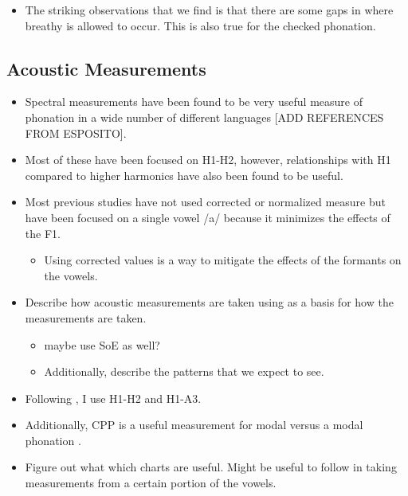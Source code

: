 \documentclass[12pt, letterpaper]{article}
\begin{document}
\begin{itemize}
	\item The striking observations that we find is that there are some gaps in where breathy is allowed to occur. This is also true for the checked phonation. 
\end{itemize}
\subsection{Acoustic Measurements} \label{sec:Acoustics}

\begin{itemize}
	\item Spectral measurements have been found to be very useful measure of phonation in a wide number of different languages [ADD REFERENCES FROM ESPOSITO]. 
	\item Most of these have been focused on H1-H2, however, relationships with H1 compared to higher harmonics have also been found to be useful. 
	\item Most previous studies have not used corrected or normalized measure but have been focused on a single vowel /a/ because it minimizes the effects of the F1.
	\begin{itemize}
		\item Using corrected values is a way to mitigate the effects of the formants on the vowels. 
	\end{itemize}
	\item Describe how acoustic measurements are taken using \citet{garellekPhoneticsVoice2019} as a basis for how the measurements are taken. 
	\begin{itemize}
		\item maybe use SoE as well?
		\item Additionally, describe the patterns that we expect to see. 
	\end{itemize}
	\item Following \citet{espositoVariationContrastivePhonation2010}, I use H1-H2 and H1-A3. 
	\item Additionally, CPP is a useful measurement for modal versus a modal phonation \citep{garellekPhoneticsWhiteHmong2021}.
	\item Figure out what which charts are useful. Might be useful to follow \citet{espositoVariationContrastivePhonation2010} in taking measurements from a certain portion of the vowels. 
\end{itemize}
\end{document}
